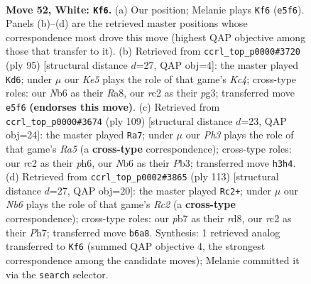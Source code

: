 \documentclass[11pt]{article}
\begin{document}
\clearpage

\begin{figure}[p]\centering
\begin{subfigure}{0.46\textwidth}\centering
\resizebox{\linewidth}{!}{%
\newchessgame
\chessboard[
  setfen={3r4/1p5k/1N4pb/4Kp1p/P7/6PP/2r5/8 w - - 0 52},
  showmover=false,
  pgfstyle=straightmove, color=movearrow, markmove={e5-f6}
]}
\caption{}
\end{subfigure}\hfill
\begin{subfigure}{0.46\textwidth}\centering
\resizebox{\linewidth}{!}{%
\newchessgame
\chessboard[
  setfen={r7/2R5/6p1/2kP4/p3P3/3K2Pp/7P/8 b - - 5 48},
  showmover=false,
  pgfstyle=straightmove, color=movearrow, markmove={c5-d6}
]}
\caption{}
\end{subfigure}
\\[4pt]
\begin{subfigure}{0.46\textwidth}\centering
\resizebox{\linewidth}{!}{%
\newchessgame
\chessboard[
  setfen={2R5/8/7P/5p2/r3p3/1p2P1P1/3k1PK1/8 b - - 0 55},
  showmover=false,
  pgfstyle=straightmove, color=movearrow, markmove={a4-a7}
]}
\caption{}
\end{subfigure}\hfill
\begin{subfigure}{0.46\textwidth}\centering
\resizebox{\linewidth}{!}{%
\newchessgame
\chessboard[
  setfen={3R4/2r1p2p/k7/P5p1/5nP1/1N3P2/5K2/8 b - - 1 57},
  showmover=false,
  pgfstyle=straightmove, color=movearrow, markmove={c7-c2}
]}
\caption{}
\end{subfigure}
\caption{\textbf{Move 52, White: \texttt{Kf6}.} (a) Our position; Melanie plays \texttt{Kf6} (\texttt{e5f6}). Panels (b)--(d) are the retrieved master positions whose correspondence most drove this move (highest QAP objective among those that transfer to it). (b) Retrieved from \texttt{ccrl\_top\_p0000\#3720} (ply 95) [structural distance $d$=27, QAP obj=4]: the master played \texttt{Kd6}; under $\mu$ our \emph{Ke5} plays the role of that game's \emph{Kc4}; cross-type roles: our \emph{N}b6 as their \emph{R}a8, our \emph{r}c2 as their \emph{p}g3; transferred move \texttt{e5f6} \textbf{(endorses this move)}. (c) Retrieved from \texttt{ccrl\_top\_p0000\#3674} (ply 109) [structural distance $d$=23, QAP obj=24]: the master played \texttt{Ra7}; under $\mu$ our \emph{Ph3} plays the role of that game's \emph{Ra5} (a \textbf{cross-type} correspondence); cross-type roles: our \emph{r}c2 as their \emph{p}h6, our \emph{N}b6 as their \emph{P}b3; transferred move \texttt{h3h4}. (d) Retrieved from \texttt{ccrl\_top\_p0002\#3865} (ply 113) [structural distance $d$=27, QAP obj=20]: the master played \texttt{Rc2+}; under $\mu$ our \emph{Nb6} plays the role of that game's \emph{Rc2} (a \textbf{cross-type} correspondence); cross-type roles: our \emph{p}b7 as their \emph{r}d8, our \emph{r}c2 as their \emph{P}h7; transferred move \texttt{b6a8}. Synthesis: 1 retrieved analog transferred to \texttt{Kf6} (summed QAP objective 4, the strongest correspondence among the candidate moves); Melanie committed it via the \texttt{search} selector.}
\label{fig:thought-m102}
\end{figure}
\end{document}
